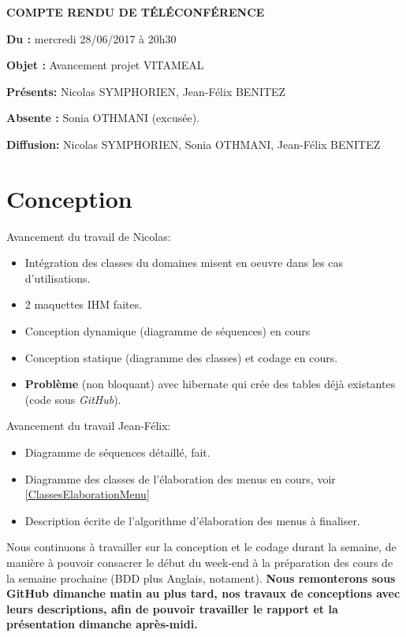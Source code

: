 \documentclass[11pt,a4paper,french,twoside,openright]{article}
\begin{document}
\pagestyle{fancy}

\begin{center}\bfseries\Huge
COMPTE RENDU DE TÉLÉCONFÉRENCE
\end{center}

\textbf{Du      :} mercredi 28/06/2017 à 20h30

\textbf{Objet   :} Avancement projet VITAMEAL

\textbf{Présents:} Nicolas SYMPHORIEN, Jean-Félix BENITEZ

\textbf{Absente :} Sonia OTHMANI (excusée).

\textbf{Diffusion:} Nicolas SYMPHORIEN, Sonia OTHMANI, Jean-Félix BENITEZ

\hrulefill

\section{Conception}
Avancement du travail de Nicolas:
\begin{itemize}
\item Intégration des classes du domaines misent en oeuvre dans les cas d'utilisations.
\item 2 maquettes IHM faites.
\item Conception dynamique (diagramme de séquences) en cours
\item Conception statique (diagramme des classes) et codage en cours.
\item \textbf{Problème} (non bloquant) avec hibernate qui crée des tables déjà existantes (code sous \emph{GitHub}).
\end{itemize}

Avancement du travail Jean-Félix:
\begin{itemize}
\item Diagramme de séquences détaillé, fait.
\item Diagramme des classes de l'élaboration des menus en cours, voir \autoref{ClassesElaborationMenu}
\item Description écrite de l'algorithme d'élaboration des menus à finaliser.
\end{itemize}

Nous continuons à travailler sur la conception et le codage durant la semaine, de manière à pouvoir consacrer le début du week-end à la préparation des cours de la semaine prochaine (BDD plus Anglais, notament). \textbf{Nous remonterons sous GitHub dimanche matin au plus tard, nos travaux de conceptions avec leurs descriptions, afin de pouvoir travailler le rapport et la présentation dimanche après-midi.}
\end{document}
